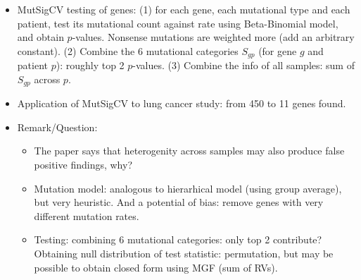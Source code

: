 \documentclass{report}
\begin{document}
\begin{itemize}
	\item MutSigCV testing of genes: (1) for each gene, each mutational type and each patient, test its mutational count against rate using Beta-Binomial model, and obtain $p$-values. Nonsense mutations are weighted more (add an arbitrary constant). (2) Combine the 6 mutational categories $S_{gp}$ (for gene $g$ and patient $p$): roughly top 2 $p$-values. (3) Combine the info of all samples: sum of $S_{gp}$ across $p$.  
	
	\item Application of MutSigCV to lung cancer study: from 450 to 11 genes found.  
	
	\item Remark/Question: 
	\begin{itemize}
		\item The paper says that heterogenity across samples may also produce false positive findings, why? 
		
		\item Mutation model: analogous to hierarhical model (using group average), but very heuristic. And a potential of bias: remove genes with very different mutation rates. 
		
		\item Testing: combining 6 mutational categories: only top 2 contribute? Obtaining null distribution of test statistic: permutation, but may be possible to obtain closed form using MGF (sum of RVs). 
	\end{itemize}
	
\end{itemize}
\end{document}
